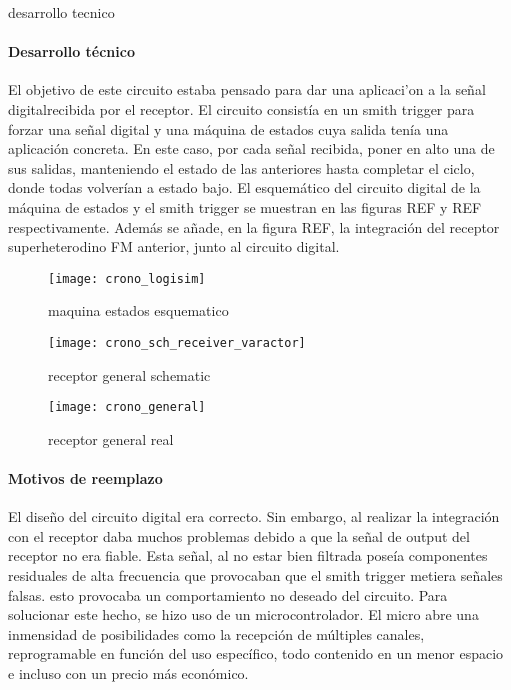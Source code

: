 desarrollo tecnico
\paragraph{Desarrollo técnico}
El objetivo de este circuito estaba pensado para dar una aplicaci'on a la señal digitalrecibida por el receptor. El circuito consistía en un smith trigger para forzar una señal digital y una máquina de estados cuya salida tenía una aplicación concreta. En este caso, por cada señal recibida, poner en alto una de sus salidas, manteniendo el estado de las anteriores hasta completar el ciclo, donde todas volverían a estado bajo. 
El esquemático del circuito digital de la máquina de estados y el smith trigger se muestran en las figuras REF y REF respectivamente.
Además se añade, en la figura REF, la integración del receptor superheterodino FM anterior, junto al circuito digital.

\begin{figure}[h!]
    \centering
    \texttt{[image: crono\_logisim]}
    \caption{maquina estados esquematico}
    \label{fig:simrx_zoom}
\end{figure}

\begin{figure}[h!]
    \centering
    \texttt{[image: crono\_sch\_receiver\_varactor]}
    \caption{receptor general schematic}
    \label{fig:simrx_zoom}
\end{figure}

\begin{figure}[h!]
    \centering
    \texttt{[image: crono\_general]}
    \caption{receptor general real}
    \label{fig:simrx_zoom}
\end{figure}

\paragraph{Motivos de reemplazo}
El diseño del circuito digital era correcto. Sin embargo, al realizar la integración con el receptor daba muchos problemas debido a que la señal de output del receptor no era fiable. Esta señal, al no estar bien filtrada poseía componentes residuales de alta frecuencia que provocaban que el smith trigger metiera señales falsas. esto provocaba un comportamiento no deseado del circuito. 
Para solucionar este hecho, se hizo uso de un microcontrolador. El micro abre una inmensidad de posibilidades como la recepci\'on de múltiples canales, reprogramable en función del uso específico, todo contenido en un menor espacio e incluso con un precio más económico.
